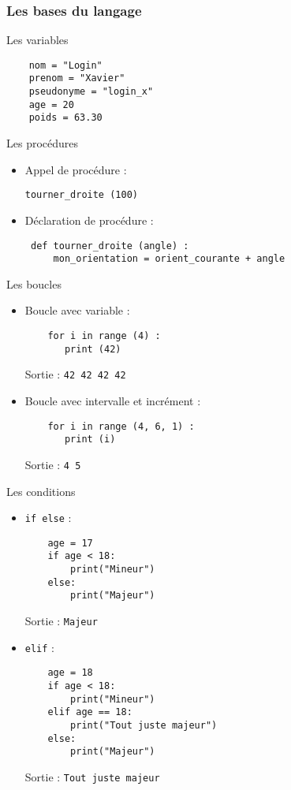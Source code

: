 \documentclass{beamer}
\begin{document}
\subsubsection{Les bases du langage}
\begin{frame}[fragile]{Les variables}
\begin{lstlisting}
    nom = "Login"
    prenom = "Xavier"
    pseudonyme = "login_x"
    age = 20
    poids = 63.30
\end{lstlisting}
\end{frame}

\begin{frame}[fragile]{Les procédures}
\begin{itemize}
\item Appel de procédure :\\
\begin{lstlisting}
tourner_droite (100)
\end{lstlisting}
\item Déclaration de procédure :\\
\begin{lstlisting}
 def tourner_droite (angle) :
     mon_orientation = orient_courante + angle
\end{lstlisting}
\end{itemize}
\end{frame}

\begin{frame}[fragile]{Les boucles}
\begin{itemize}
\item Boucle avec variable :
    \begin{lstlisting}
    for i in range (4) :
       print (42)
    \end{lstlisting}
    Sortie : \verb+42 42 42 42+
\item Boucle avec intervalle et incrément :
    \begin{lstlisting}
    for i in range (4, 6, 1) :
       print (i)
    \end{lstlisting}
    Sortie : \verb+4 5+
\end{itemize}
\end{frame}

\begin{frame}[fragile]{Les conditions}
\begin{itemize}
\item \verb+if else+ :
    \begin{lstlisting}
    age = 17
    if age < 18:
        print("Mineur")
    else:
        print("Majeur")
    \end{lstlisting}
    Sortie : \verb+Majeur+
\item \verb+elif+ :
    \begin{lstlisting}
    age = 18
    if age < 18:
        print("Mineur")
    elif age == 18:
        print("Tout juste majeur")
    else:
        print("Majeur")
    \end{lstlisting}
    Sortie : \verb+Tout juste majeur+
\end{itemize}
\end{frame}
\end{document}
